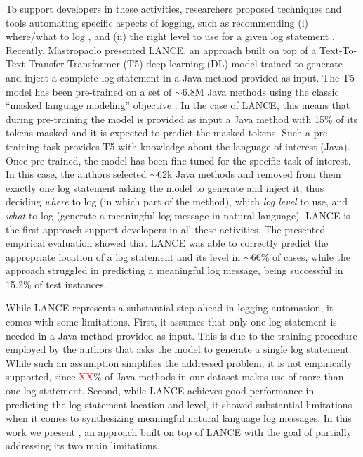 To support developers in these activities, researchers proposed techniques and tools automating specific aspects of logging, such as recommending (i) where/what to log \cite{yuan2010sherlog,jia2018smartlog,li2018studying,li2020shall}, and (ii) the right level to use for a given log statement \cite{yuan2012characterizing,oliner2012advances,li2017log,li2020qualitative,li2021deeplv}. Recently, Mastropaolo \etal \cite{mastropaolo2022using} presented LANCE, an approach built on top of a Text-To-Text-Transfer-Transformer (T5) deep learning (DL) model \cite{raffel2019exploring} trained to generate and inject a complete log statement in a Java method provided as input. The T5 model has been pre-trained on a set of $\sim$6.8M Java methods using the classic ``masked language modeling'' objective \cite{raffel2019exploring}. In the case of LANCE, this means that during pre-training the model is provided as input a Java method with 15\% of its tokens masked and it is expected to predict the masked tokens. Such a pre-training task provides T5 with knowledge about the language of interest (\ie Java). Once pre-trained, the model has been fine-tuned for the specific task of interest. In this case, the authors selected $\sim$62k Java methods and removed from them exactly one log statement asking the model to generate and inject it, thus deciding \emph{where} to log (\ie in which part of the method), which \emph{log level} to use, and \emph{what} to log (\ie generate a meaningful log message in natural language). LANCE is the first approach support developers in all these activities. The presented empirical evaluation showed that LANCE was able to correctly predict the appropriate location of a log statement and its level in $\sim$66\% of cases, while the approach struggled in predicting a meaningful log message, being successful in 15.2\% of test instances.

While LANCE represents a substantial step ahead in logging automation, it comes with some limitations. First, it assumes that only one log statement is needed in a Java method provided as input. This is due to the training procedure employed by the authors that asks the model to generate a single log statement. While such an assumption simplifies the addressed problem, it is not empirically supported, since \textcolor{red}{XX}\% of Java methods in our dataset makes use of more than one log statement. Second, while LANCE achieves good performance in predicting the log statement location and level, it showed substantial limitations when it comes to synthesizing meaningful natural language log messages. In this work we present \approach, an approach built on top of LANCE with the goal of partially addressing its two main limitations.

